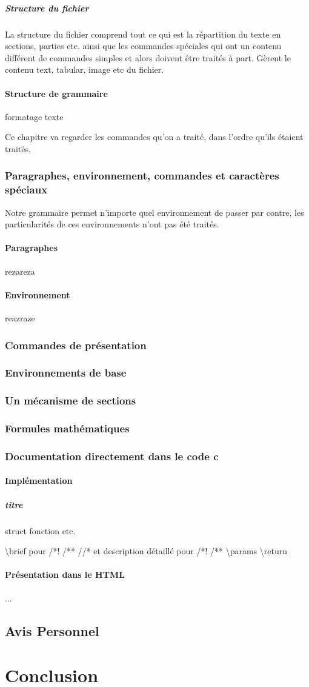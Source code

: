 \documentclass{report}
\begin{document}
{{\subsubsection{Structure du fichier}{
La structure du fichier comprend tout ce qui est la répartition du texte en sections, parties etc. ainsi que les commandes spéciales qui ont un contenu différent de commandes simples et alors doivent être traités à part.
Gèrent le contenu text, tabular, image etc du fichier.
}
}
\subsection{Structure de grammaire}{
formatage texte
  
Ce chapitre va regarder les commandes qu'on a traité, dans l'ordre qu'ils étaient traités.
}
}
\section{Paragraphes, environnement, commandes et caractères spéciaux}{
Notre grammaire permet n'importe quel environnement de passer par contre, les particularités de ces environnements n'ont pas été traités.
\subsection{Paragraphes}{rezareza}
\subsection{Environnement}{reazraze}
}
\section{Commandes de présentation}{}
\section{Environnements de base}{}
\section{Un mécanisme de sections}{}
\section{Formules mathématiques}{}
\section{Documentation directement dans le code c}{
\subsection{Implémentation}{
\subsubsection{titre}{ struct fonction etc.}}
\textbackslash brief pour /*! /** //* et description détaillé pour /*! /**
\textbackslash params
\textbackslash  return
\subsection{Présentation dans le HTML}{ ...}}
\chapter{Avis Personnel}
\part{Conclusion}
\end{document}

